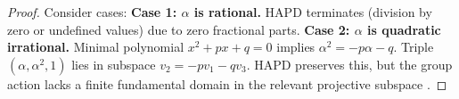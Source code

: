 
\begin{proof}
Consider cases:
\textbf{Case 1: $\alpha$ is rational.} HAPD terminates (division by zero or undefined values) due to zero fractional parts.
\textbf{Case 2: $\alpha$ is quadratic irrational.} Minimal polynomial $x^2+px+q=0$ implies $\alpha^2 = -p\alpha - q$. Triple $(\alpha, \alpha^2, 1)$ lies in subspace $v_2 = -pv_1 - qv_3$. HAPD preserves this, but the group action lacks a finite fundamental domain in the relevant projective subspace \cite{Khinchin1964}.
\end{proof}
